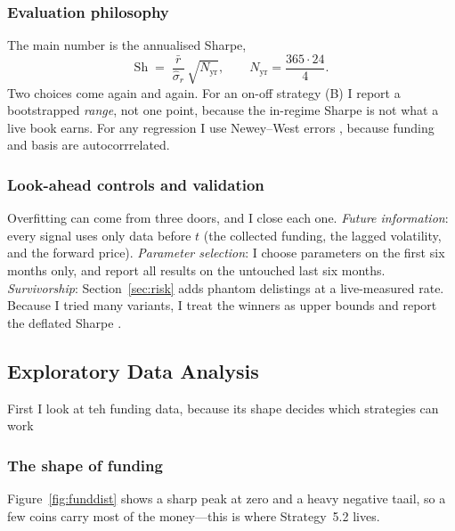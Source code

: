 \documentclass[10pt,twocolumn,a4paper]{article}
\begin{document}
\subsubsection{Evaluation philosophy}

The main number is the annualised Sharpe,
\begin{equation}
  \text{Sh} \;=\; \frac{\bar r}{\hat\sigma_r}\,\sqrt{N_{\text{yr}}},
  \qquad N_{\text{yr}} = \frac{365\cdot 24}{4}.
  \label{eq:sharpe}
\end{equation}
Two choices come again and again.  For an on-off strategy (B) I report a bootstrapped
\emph{range}, not one point, because the in-regime Sharpe is not what a live book
earns.  For any regression I use Newey--West errors \cite{newey1987simple}, because
funding and basis are autocorrrelated.

\subsubsection{Look-ahead controls and validation}

Overfitting can come from three doors, and I close each one.  \emph{Future
information}: every signal uses only data before $t$ (the collected funding, the
lagged volatility, and the forward price).  \emph{Parameter selection}: I choose
parameters on the first six months only, and report all results on the untouched last
six months.  \emph{Survivorship}: Section~\ref{sec:risk} adds phantom delistings at a
live-measured rate.  Because I tried many variants, I treat the winners as upper
bounds and report the deflated Sharpe \cite{bailey2014deflated}.


\subsection{Exploratory Data Analysis}
\label{sec:eda}

First I look at teh funding data, because its shape decides which strategies can work

\subsubsection{The shape of funding}

Figure~\ref{fig:funddist} shows a sharp peak at zero and a heavy negative taail, so a
few coins carry most of the money---this is where Strategy~5.2 lives.
\end{document}
